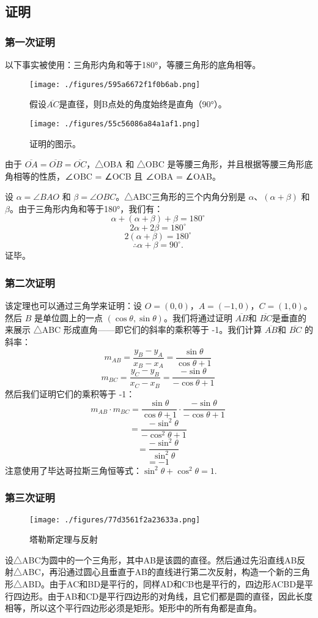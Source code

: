 \subsection{证明}  
\subsubsection{第一次证明}  
以下事实被使用：三角形内角和等于180°，等腰三角形的底角相等。
\begin{figure}[ht]
\centering
\texttt{[image: ./figures/595a6672f1f0b6ab.png]}
\caption{假设\(\overline{AC}\)是直径，则B点处的角度始终是直角（90°）。} \label{fig_Thales_3}
\end{figure}
\begin{figure}[ht]
\centering
\texttt{[image: ./figures/55c56086a84a1af1.png]}
\caption{证明的图示。} \label{fig_Thales_4}
\end{figure}
由于 \(\overline{OA} = \overline{OB} = \overline{OC}\)，△OBA 和 △OBC 是等腰三角形，并且根据等腰三角形底角相等的性质，∠OBC = ∠OCB 且 ∠OBA = ∠OAB。

设 \(\alpha = \angle BAO\) 和 \(\beta = \angle OBC\)。△ABC三角形的三个内角分别是 \(\alpha\)、\((\alpha + \beta)\) 和 \(\beta\)。由于三角形内角和等于180°，我们有：
\[
\alpha + (\alpha + \beta) + \beta = 180^\circ~
\]
\[
2\alpha + 2\beta = 180^\circ~
\]
\[
2(\alpha + \beta) = 180^\circ~
\]
\[
\therefore \alpha + \beta = 90^\circ.~
\]
证毕。
\subsubsection{第二次证明}  
该定理也可以通过三角学来证明：设 \( O = (0, 0) \)，\( A = (-1, 0) \)，\( C = (1, 0) \)。然后 \( B \) 是单位圆上的一点 \((\cos \theta, \sin \theta)\)。我们将通过证明 \(\overline{AB}\)和 \(\overline{BC}\)是垂直的来展示 △ABC 形成直角——即它们的斜率的乘积等于 -1。我们计算 \(\overline{AB}\)和 \(\overline{BC}\) 的斜率：
\[
m_{AB} = \frac{y_B - y_A}{x_B - x_A} = \frac{\sin \theta}{\cos \theta + 1}~
\]
\[
m_{BC} = \frac{y_C - y_B}{x_C - x_B} = \frac{-\sin \theta}{-\cos \theta + 1}~
\]
然后我们证明它们的乘积等于 -1：
\[
m_{AB} \cdot m_{BC} = \frac{\sin \theta}{\cos \theta + 1} \cdot \frac{-\sin \theta}{-\cos \theta + 1}~
\]
\[
= \frac{-\sin^2 \theta}{-\cos^2 \theta + 1}~
\]
\[
= \frac{-\sin^2 \theta}{\sin^2 \theta}~
\]
\[
= -1~
\]
注意使用了毕达哥拉斯三角恒等式：\(\sin^2 \theta + \cos^2 \theta = 1\).
\subsubsection{第三次证明}
\begin{figure}[ht]
\centering
\texttt{[image: ./figures/77d3561f2a23633a.png]}
\caption{塔勒斯定理与反射} \label{fig_Thales_5}
\end{figure}
设△ABC为圆中的一个三角形，其中AB是该圆的直径。然后通过先沿直线AB反射△ABC，再沿通过圆心且垂直于AB的直线进行第二次反射，构造一个新的三角形△ABD。由于AC和BD是平行的，同样AD和CB也是平行的，四边形ACBD是平行四边形。由于AB和CD是平行四边形的对角线，且它们都是圆的直径，因此长度相等，所以这个平行四边形必须是矩形。矩形中的所有角都是直角。